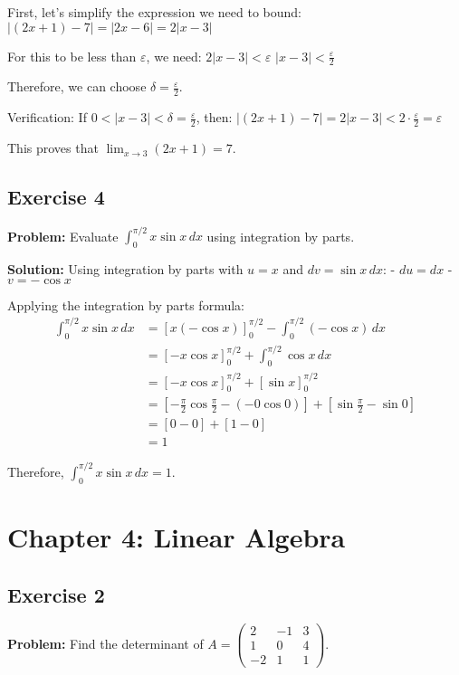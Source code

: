 First, let's simplify the expression we need to bound:
$|(2x + 1) - 7| = |2x - 6| = 2|x - 3|$

For this to be less than $\varepsilon$, we need:
$2|x - 3| < \varepsilon$
$|x - 3| < \frac{\varepsilon}{2}$

Therefore, we can choose $\delta = \frac{\varepsilon}{2}$.

Verification: If $0 < |x - 3| < \delta = \frac{\varepsilon}{2}$, then:
$|(2x + 1) - 7| = 2|x - 3| < 2 \cdot \frac{\varepsilon}{2} = \varepsilon$

This proves that $\lim_{x \to 3} (2x + 1) = 7$.

\subsection{Exercise 4}
\textbf{Problem:} Evaluate $\int_0^{\pi/2} x \sin x \, dx$ using integration by parts.

\textbf{Solution:}
Using integration by parts with $u = x$ and $dv = \sin x \, dx$:
- $du = dx$
- $v = -\cos x$

Applying the integration by parts formula:
\begin{align}
\int_0^{\pi/2} x \sin x \, dx &= \left[x(-\cos x)\right]_0^{\pi/2} - \int_0^{\pi/2} (-\cos x) \, dx \\
&= \left[-x \cos x\right]_0^{\pi/2} + \int_0^{\pi/2} \cos x \, dx \\
&= \left[-x \cos x\right]_0^{\pi/2} + \left[\sin x\right]_0^{\pi/2} \\
&= \left[-\frac{\pi}{2} \cos\frac{\pi}{2} - (-0 \cos 0)\right] + \left[\sin\frac{\pi}{2} - \sin 0\right] \\
&= [0 - 0] + [1 - 0] \\
&= 1
\end{align}

Therefore, $\int_0^{\pi/2} x \sin x \, dx = 1$.

\section{Chapter 4: Linear Algebra}

\subsection{Exercise 2}
\textbf{Problem:} Find the determinant of $A = \begin{pmatrix} 2 & -1 & 3 \\ 1 & 0 & 4 \\ -2 & 1 & 1 \end{pmatrix}$.

